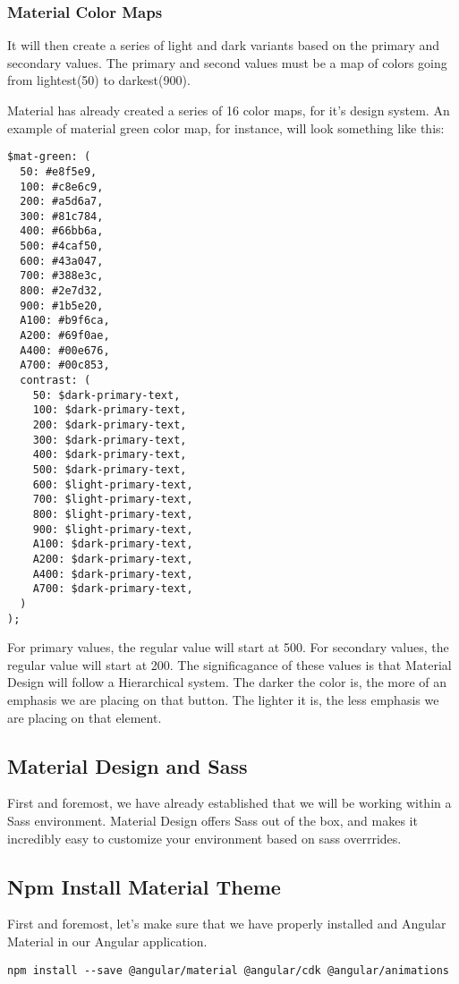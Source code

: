 \subsubsection{Material Color Maps}

It will then create a series of light and dark variants based on the primary 
and secondary values. The primary and second values must be a map of colors 
going from lightest(50) to darkest(900). 

Material has already created a series of 16 color maps, for it's design system. 
An example of material green color map, for instance, will look something like 
this: 
\begin{lstlisting}
$mat-green: (
  50: #e8f5e9,
  100: #c8e6c9,
  200: #a5d6a7,
  300: #81c784,
  400: #66bb6a,
  500: #4caf50,
  600: #43a047,
  700: #388e3c,
  800: #2e7d32,
  900: #1b5e20,
  A100: #b9f6ca,
  A200: #69f0ae,
  A400: #00e676,
  A700: #00c853,
  contrast: (
    50: $dark-primary-text,
    100: $dark-primary-text,
    200: $dark-primary-text,
    300: $dark-primary-text,
    400: $dark-primary-text,
    500: $dark-primary-text,
    600: $light-primary-text,
    700: $light-primary-text,
    800: $light-primary-text,
    900: $light-primary-text,
    A100: $dark-primary-text,
    A200: $dark-primary-text,
    A400: $dark-primary-text,
    A700: $dark-primary-text,
  )
);
\end{lstlisting}

For primary values, the regular value will start at 500. For secondary values, 
the regular value will start at 200. The significagance of these values is that 
Material Design will follow a Hierarchical system. The darker the color is, the 
more of an emphasis we are placing on that button. The lighter it is, the less 
emphasis we are placing on that element. 

\subsection{Material Design and Sass}
First and foremost, we have already established that we will be working within
a Sass environment. Material Design offers Sass out of the box, and makes it 
incredibly easy to customize your environment based on sass overrrides. 

\subsection{Npm Install Material Theme}
First and foremost, let's make sure that we have properly installed and Angular
Material in our Angular application. 
\begin{lstlisting}
npm install --save @angular/material @angular/cdk @angular/animations
\end{lstlisting}

